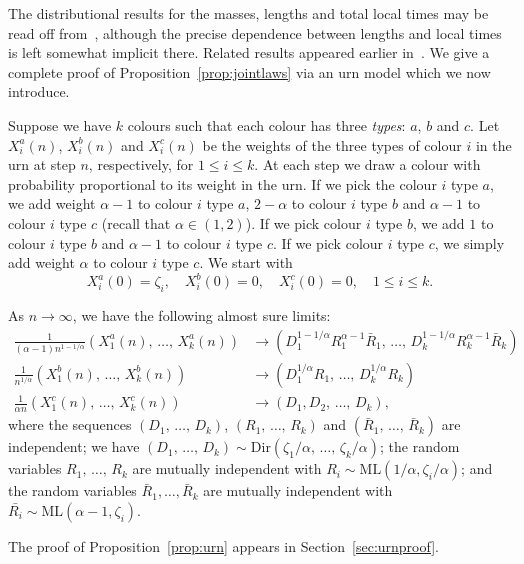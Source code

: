 \documentclass[AHL,Unicode,longabstracts,published]{cedram}
\newcommand{\ML}{\mathrm{ML}}
\newcommand{\Dir}{\mathrm{Dir}}
\begin{document}
The distributional results for the masses, lengths and total local times may be read off from~\cite{GHlinebreaking}, although the precise dependence between lengths and local times is left somewhat implicit there. Related results appeared earlier in~\cite{HaasPitmanWinkel}. We give a complete proof of Proposition~\ref{prop:jointlaws} via an urn model which we now introduce.


Suppose we have $k$ colours such that each colour has three \emph{types}: $a$, $b$ and $c$. Let $X_i^a(n)$, $X_i^b(n)$ and $X_i^c(n)$ be the weights of the three types of colour $i$ in the urn at step $n$, respectively, for $1 \le i \le k$. At each step we draw a colour with probability proportional to its weight in the urn. If we pick the colour $i$ type $a$, we add weight $\alpha-1$ to colour $i$ type $a$, $2-\alpha$ to colour $i$ type $b$ and $\alpha-1$ to colour $i$ type $c$ (recall that $\alpha \in (1,2)$). If we pick colour $i$ type $b$, we add $1$ to colour $i$ type $b$ and $\alpha-1$ to colour $i$ type $c$. If we pick colour $i$ type $c$, we simply add weight $\alpha$ to colour $i$ type $c$. We start with
\[
X^a_i(0) = \zeta_i, \quad X^b_i(0) = 0, \quad X^c_i(0) = 0, \quad 1 \le i \le k.
\]


\begin{prop}\label{prop:urn}
As $n \to \infty$, we have the following almost sure limits:
\begin{align*}
\frac{1}{(\alpha-1) n^{1-1/\alpha}}\left(X^a_1(n),\, \ldots,\,X^a_k(n)\right) & \to \left(D_1^{1-1/\alpha} R_1^{\alpha-1} \bar{R}_1,\,\ldots,\,D_k^{1-1/\alpha} R_k^{\alpha-1} \bar{R}_k\right)\\
\frac{1}{n^{1/\alpha}} \left(X^b_1(n),\,\ldots,\, X^b_k(n)\right) & \to \left(D_1^{1/\alpha} R_1, \,\ldots,\,D_k^{1/\alpha} R_k\right) \\
\frac{1}{\alpha n} \left(X^c_1(n),\,\ldots,\,X^c_k(n)\right) & \to \left(D_1, D_2,\,\ldots,\,D_k\right),
\end{align*}
where the sequences $(D_1,\,\ldots,\,D_k)$, $(R_1,\, \ldots,\,R_k)$ and $(\bar{R}_1,\,\ldots,\,\bar{R}_k)$ are independent; we have $(D_1,\,\ldots,\,D_k) \sim \Dir(\zeta_1/\alpha,\,\ldots,\,\zeta_k/\alpha)$; the random variables $R_1,\,\ldots,\,R_k$ are mutually independent with $R_i \sim \ML(1/\alpha, \zeta_i/\alpha)$; and the random variables $\bar{R}_1, \ldots,\bar{R}_k$ are mutually independent with $\bar{R_i} \sim\ML(\alpha-1,\zeta_i)$.
\end{prop}

The proof of Proposition~\ref{prop:urn} appears in Section~\ref{sec:urnproof}.
\end{document}
